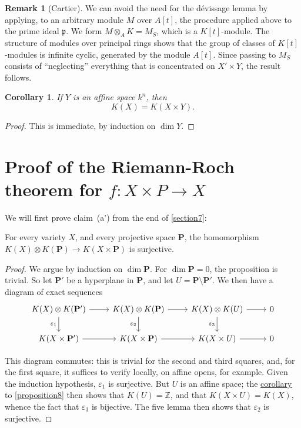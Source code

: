 \documentclass{article}
\theoremstyle{plain}
\newenvironment{proposition}[1]
    {\renewcommand\theinnercustomproposition{#1}\innercustomproposition}
    {\endinnercustomproposition}
\newtheorem*{corollary}{Corollary}
\theoremstyle{definition}
\newtheorem*{remark}{Remark}
\newcommand{\PP}{\mathbf{P}}
\newcommand{\oldpage}[1]{\marginpar{\footnotesize$\Big\vert$ \textit{p.~#1}}}
\begin{document}
\oldpage{118}
\begin{remark}[Cartier]
  We can avoid the need for the d\'{e}vissage lemma by applying, to an arbitrary module $M$ over $A[t]$, the procedure applied above to the prime ideal $\mathfrak{p}$.
  We form $M\otimes_A K=M_S$, which is a $K[t]$-module.
  The structure of modules over principal rings shows that the group of classes of $K[t]$-modules is infinite cyclic, generated by the module $A[t]$.
  Since passing to $M_S$ consists of ``neglecting'' everything that is concentrated on $X'\times Y$, the result follows.
\end{remark}

\begin{corollary}
\label{corollary-8}
  If $Y$ is an affine space $k^n$, then
  \[
    K(X) = K(X\times Y).
  \]
\end{corollary}

\begin{proof}
  This is immediate, by induction on $\dim Y$.
\end{proof}


\section{Proof of the Riemann-Roch theorem for \texorpdfstring{$f\colon X\times P\to X$}{f:XxP->X}}
\label{section9}

We will first prove claim~(a') from the end of \cref{section7}:

\begin{proposition}{9}
\label{proposition9}
  For every variety $X$, and every projective space $\PP$, the homomorphism $K(X)\otimes K(\PP)\to K(X\times \PP)$ is surjective.
\end{proposition}

\begin{proof}
  We argue by induction on $\dim\PP$.
  For $\dim\PP=0$, the proposition is trivial.
  So let $\PP'$ be a hyperplane in $\PP$, and let $U=\PP\setminus\PP'$.
  We then have a diagram of exact sequences
  \[
    \begin{tikzcd}
      K(X)\otimes K(\PP') \rar \dar[swap,"\varepsilon_1"]
      & K(X)\otimes K(\PP) \rar \dar[swap,"\varepsilon_2"]
      & K(X)\otimes K(U) \rar \dar[swap,"\varepsilon_3"]
      & 0
    \\K(X\times\PP') \rar
      & K(X\times\PP) \rar
      & K(X\times U) \rar
      & 0
    \end{tikzcd}
  \]

  This diagram commutes:
  this is trivial for the second and third squares, and, for the first square, it suffices to verify locally, on affine opens, for example.
  Given the induction hypothesis, $\varepsilon_1$ is surjective.
  But $U$ is an affine space;
  the \hyperref[corollary-8]{corollary} to \cref{proposition8} then shows that $K(U)=\mathbb{Z}$, and that $K(X\times U)=K(X)$, whence the fact that $\varepsilon_3$ is bijective.
  The five lemma then shows that $\varepsilon_2$ is surjective.
\end{proof}
\end{document}
